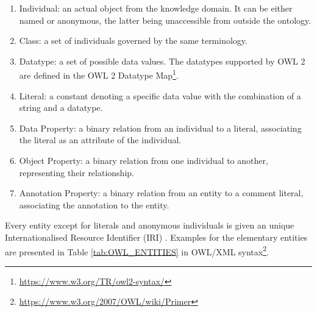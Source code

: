 \begin{spacing}{1.2}
\begin{enumerate}
	\item Individual: an actual object from the knowledge domain. It can be either named or anonymous, the latter being unaccessible from outside the ontology.
	\item Class: a set of individuals governed by the same terminology.
	\item Datatype: a set of possible data values. The datatypes supported by OWL 2 are defined in the OWL 2 Datatype Map\footnote{\url{https://www.w3.org/TR/owl2-syntax/}}.
	\item Literal: a constant denoting a specific data value with the combination of a string and a datatype.
	\item Data Property: a binary relation from an individual to a literal, associating the literal as an attribute of the individual.
	\item Object Property: a binary relation from one individual to another, representing their relationship.
	\item Annotation Property: a binary relation from an entity to a comment literal, associating the annotation to the entity.
\end{enumerate}
\end{spacing}

Every entity except for literals and anonymous individuals is given an unique Internationalised Resource Identifier (IRI) \cite{DBLP:journals/rfc/rfc3987}. Examples for the elementary entities are presented in Table \ref{tab:OWL_ENTITIES} in OWL/XML syntax\footnote{\url{https://www.w3.org/2007/OWL/wiki/Primer}}.
\\

